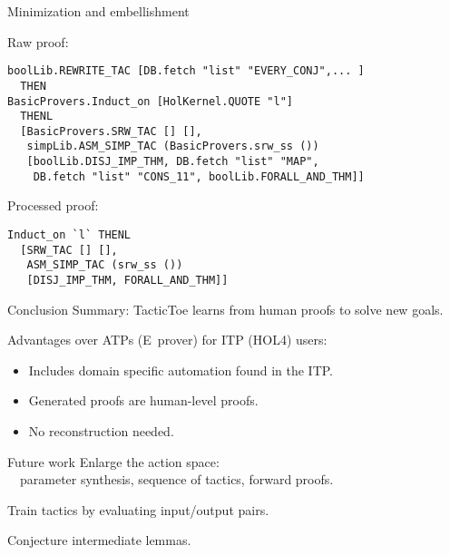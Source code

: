\documentclass{beamer}
\def\holfour{\textsf{HOL4}\xspace}
\def\eprover{\textsf{E~prover}\xspace}
\begin{document}
\begin{frame}[fragile]{Minimization and embellishment}

Raw proof:
\begin{lstlisting}[language=SMLSmall]
boolLib.REWRITE_TAC [DB.fetch "list" "EVERY_CONJ",... ] 
  THEN
BasicProvers.Induct_on [HolKernel.QUOTE "l"] 
  THENL
  [BasicProvers.SRW_TAC [] [],
   simpLib.ASM_SIMP_TAC (BasicProvers.srw_ss ()) 
   [boolLib.DISJ_IMP_THM, DB.fetch "list" "MAP", 
    DB.fetch "list" "CONS_11", boolLib.FORALL_AND_THM]]
\end{lstlisting}

\vspace{5mm}
Processed proof:
\begin{lstlisting}[language=SMLSmall]
Induct_on `l` THENL
  [SRW_TAC [] [], 
   ASM_SIMP_TAC (srw_ss ()) 
   [DISJ_IMP_THM, FORALL_AND_THM]]
\end{lstlisting}

\end{frame}

\begin{frame}{Conclusion}
Summary: TacticToe learns from human proofs to solve new goals.

\vspace{5mm}

Advantages over ATPs (\eprover) for ITP (\holfour) users:
\begin{itemize}
\item Includes domain specific automation found in the ITP.
\item Generated proofs are human-level proofs.\\
\item No reconstruction needed.\\
\end{itemize}


\end{frame}

\begin{frame}{Future work}
Enlarge the action space:\\ \ \
  parameter synthesis, sequence of tactics, forward proofs.

\vspace{5mm}

Train tactics by evaluating input/output pairs.

\vspace{5mm}

Conjecture intermediate lemmas.
\vspace{5mm}
\end{frame}
 
\end{document}
